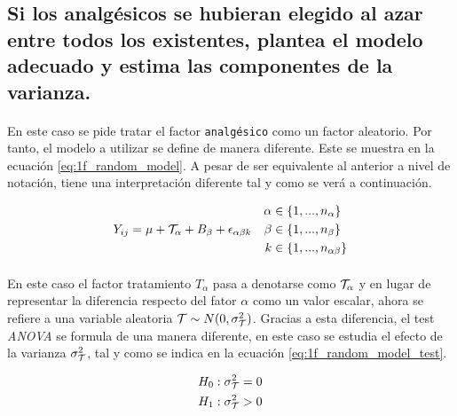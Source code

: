 \documentclass[11pt]{article}
\begin{document}
    \subsection{Si los analgésicos se hubieran elegido al azar entre todos los existentes, plantea el modelo adecuado y estima las componentes de la varianza.}

      \paragraph{}
      En este caso se pide tratar el factor \texttt{analgésico} como un factor aleatorio. Por tanto, el modelo a utilizar se define de manera diferente. Este se muestra en la ecuación \eqref{eq:1f_random_model}. A pesar de ser equivalente al anterior a nivel de notación, tiene una interpretación diferente tal y como se verá a continuación.

      \begin{align}
      \label{eq:1f_random_model}
        Y_{ij} = \mu + \mathcal{T}_\alpha + B_\beta + \epsilon_{\alpha \beta k} &&
        \begin{split}
          \alpha &\in \{1,...,n_\alpha \} \\
          \beta &\in \{1, ..., n_\beta \} \\
          k &\in \{1,...,  n_{\alpha\beta} \}
        \end{split}
      \end{align}

      \paragraph{}
      En este caso el factor tratamiento $T_\alpha$ pasa a denotarse como $\mathcal{T}_\alpha$ y en lugar de representar la diferencia respecto del fator $\alpha$ como un valor escalar, ahora se refiere a una variable aleatoria $\mathcal{T} \sim N(0, \sigma_{\mathcal{T}}^2)$. Gracias a esta diferencia, el test \emph{ANOVA} se formula de una manera diferente, en este caso se estudia el efecto de la varianza $\sigma_{\mathcal{T}}^2$, tal y como se indica en la ecuación \eqref{eq:1f_random_model_test}.

      \begin{align}
      \label{eq:1f_random_model_test}
        \begin{split}
          H_0: \sigma^2_{\mathcal{T}} = 0 \\
          H_1: \sigma^2_{\mathcal{T}} > 0
        \end{split}
      \end{align}
\end{document}
